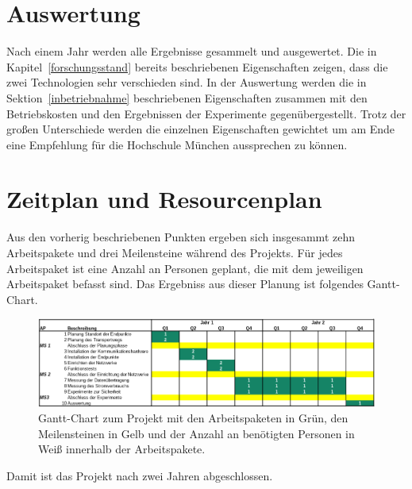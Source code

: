 \section{Auswertung}

Nach einem Jahr werden alle Ergebnisse gesammelt und ausgewertet.
Die in Kapitel~\ref{forschungsstand} bereits beschriebenen Eigenschaften zeigen, dass die zwei Technologien sehr verschieden sind.
In der Auswertung werden die in Sektion~\ref{inbetriebnahme} beschriebenen Eigenschaften zusammen mit den Betriebskosten und den Ergebnissen der Experimente gegenübergestellt.
Trotz der großen Unterschiede werden die einzelnen Eigenschaften gewichtet um am Ende eine Empfehlung für die Hochschule München aussprechen zu können.

\section{Zeitplan und Resourcenplan}

Aus den vorherig beschriebenen Punkten ergeben sich insgesammt zehn Arbeitspakete und drei Meilensteine während des Projekts.
Für jedes Arbeitspaket ist eine Anzahl an Personen geplant, die mit dem jeweiligen Arbeitspaket befasst sind.
Das Ergebniss aus dieser Planung ist folgendes Gantt-Chart.

\begin{figure}[htbp] 
  \centering
     \includegraphics[width=1\textwidth]{img/gannt.png}
     \caption{Gantt-Chart zum Projekt mit den Arbeitspaketen in Grün, den Meilensteinen in Gelb und der Anzahl an benötigten Personen in Weiß innerhalb der Arbeitspakete.}
     \label{fig:gantt}
\end{figure}

Damit ist das Projekt nach zwei Jahren abgeschlossen.

